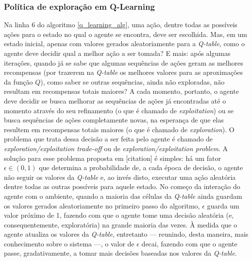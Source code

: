 \documentclass[cic,tc]{iiufrgs}
\begin{document}
\subsubsection{Política de exploração em Q-Learning}
Na linha 6 do algoritmo \ref{q_learning_alg}, uma ação, dentre todas as
possíveis ações para o estado no qual o agente se encontra, deve ser escolhida.
Mas, em um estado inicial, apenas com valores gerados aleatoriamente para a
\textit{Q-table}, como o agente deve decidir qual a melhor ação a ser tomada? E
mais: após algumas iterações, quando já se sabe que algumas sequências de ações
geram as melhores recompensas (por trazerem na \textit{Q-table} os melhores
valores para as aproximações da função $Q$), como saber se outras sequências,
ainda não exploradas, não resultam em recompensas totais maiores? A cada
momento, portanto, o agente deve decidir se busca melhorar as sequências de
ações já encontradas até o momento através do seu refinamento (o que é chamado de
\textit{exploitation}) ou se busca sequências de ações completamente novas, na
esperança de que elas resultem em recompensas totais maiores (o que é chamado de
\textit{exploration}). O problema que trata dessa decisão a ser feita pelo
agente é chamado de \textit{exploration/exploitation trade-off} ou de \textit{
exploration/exploitation problem}. A solução para esse problema proposta em
[citation] é simples: há um fator $\epsilon \in (0,1)$ que determina a
probabilidade de, a cada época de decisão, o agente não seguir os valores da
\textit{Q-table} e, ao invés disto, executar uma ação aleatória dentre todas as
outras possíveis para aquele estado. No começo da interação do agente com o
ambiente, quando a maioria das células da \textit{Q-table} ainda guardam os
valores gerados aleatoriamente no primeiro passo do algoritmo, $\epsilon$ guarda
um valor próximo de 1, fazendo com que o agente tome uma decisão aleatória (e,
consequentemente, exploratória) na grande maioria das vezes. À medida que o
agente atualiza os valores da \textit{Q-table}, entretanto --- reunindo, desta
maneira, mais conhecimento sobre o sistema ---, o valor de $\epsilon$ decai,
fazendo com que o agente passe, gradativamente, a tomar mais decisões baseadas
nos valores da \textit{Q-table}.

\end{document}

